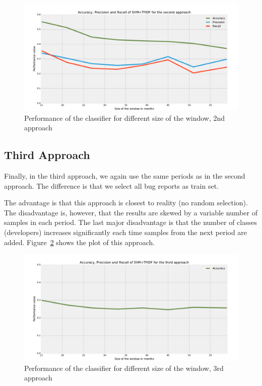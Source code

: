 \begin{figure}[htbp]
    \centering
        \includegraphics[width=\textwidth]{./images/window_size/firefox_2a.pdf}
    \caption{Performance of the classifier for different size of the window, 2nd approach}
    \label{fig:window.firefox.2a}
\end{figure}

\subsection{Third Approach}

Finally, in the third approach, we again use the same periods as in the second approach. The difference is that we select all bug reports as train set.

The advantage is that this approach is closest to reality (no random selection). The disadvantage is, however, that the results are skewed by a variable number of samples in each period. The last major disadvantage is that the number of classes (developers) increases significantly each time samples from the next period are added. Figure~\ref{fig:window.firefox.3a} shows the plot of this approach.

\begin{figure}[htbp]
    \centering
        \includegraphics[width=\textwidth]{./images/window_size/firefox_3a.pdf}
    \caption{Performance of the classifier for different size of the window, 3rd approach}
    \label{fig:window.firefox.3a}
\end{figure}

